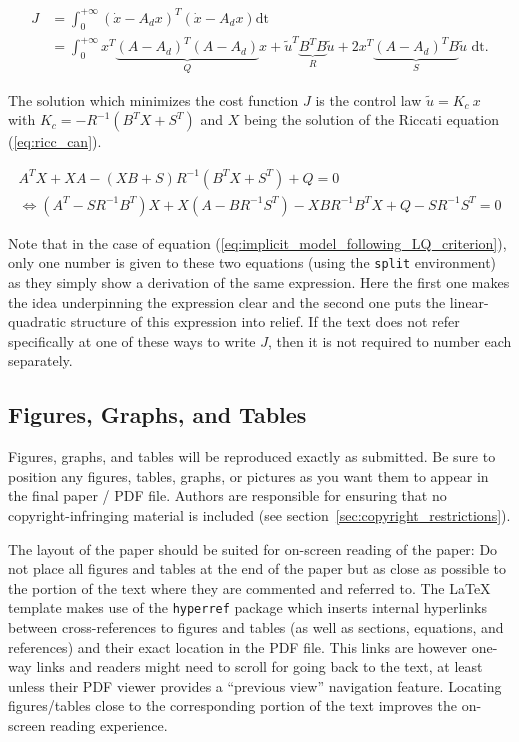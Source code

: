 \documentclass{CEAS_EuroGNC_2024}
\begin{document}
\begin{equation}\begin{split}
J &= \displaystyle\int_0^{+\infty}{(\dot{x}-A_{d}x)^T (\dot{x}-A_{d}x)} \text{dt}\\
  &= \displaystyle\int_0^{+\infty}{x^T\underbrace{(A-A_{d})^T (A-A_{d})}_{Q}x}
  + {\tilde{u}^T\underbrace{B^T B}_{R}\tilde{u}}
  + {2 x^T\underbrace{(A-A_{d})^T B}_{S}\tilde{u}}\text{ dt}.
\end{split}\label{eq:implicit_model_following_LQ_criterion}\end{equation}

The solution which minimizes the cost function $J$ is the control law $\tilde{u}=K_c\ x$ with $K_c=-R^{-1}(B^T X+S^T)$ and $X$ being the solution of the Riccati equation (\ref{eq:ricc_can}).

\begin{align}
A^T X + X A - (X B + S) R^{-1} (B^T X + S^T) + Q = 0\label{eq:ricc_can}\\
\Leftrightarrow (A^T-S R^{-1} B^T) X+ X (A-B R^{-1} S^T) - X B R^{-1} B^T X + Q - S R^{-1} S^T = 0\label{eq:ricc}
\end{align}

\color{black}

Note that in the case of equation (\ref{eq:implicit_model_following_LQ_criterion}), only one number is given to these two equations (using the \verb|split| environment) as they simply show a derivation of the same expression. Here the first one makes the idea underpinning the expression clear and the second one puts the linear-quadratic structure of this expression into relief. If the text does not refer specifically at one of these ways to write $J$, then it is not required to number each separately.



\subsection{Figures, Graphs, and Tables}\label{sec:fig_graph_tables}

Figures, graphs, and tables will be reproduced exactly as submitted. Be sure to position any figures, tables, graphs, or pictures as you want them to appear in the final paper / PDF file. Authors are responsible for ensuring that no copyright-infringing material is included (see section~\ref{sec:copyright_restrictions}).

The layout of the paper should be suited for on-screen reading of the paper: Do not place all figures and tables at the end of the paper but as close as possible to the portion of the text where they are commented and referred to. The \LaTeX{} template makes use of the \verb|hyperref| package which inserts internal hyperlinks between cross-references to figures and tables (as well as sections, equations, and references) and their exact location in the PDF file. This links are however one-way links and readers might need to scroll for going back to the text, at least unless their PDF viewer provides a ``previous view'' navigation feature. Locating figures/tables close to the corresponding portion of the text improves the on-screen reading experience.
\end{document}
